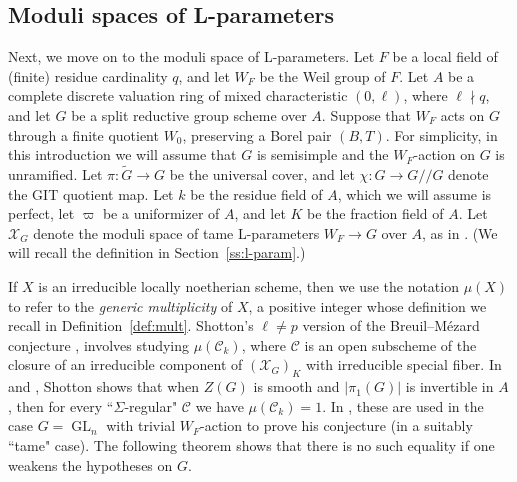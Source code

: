 \documentclass[11pt,reqno]{amsart}
\theoremstyle{definition}
\newcommand{\sC}{{\mathscr C}}
\newcommand{\sX}{{\mathscr X}}
\DeclareMathOperator{\GL}{GL}
\begin{document}
\subsection{Moduli spaces of L-parameters}

Next, we move on to the moduli space of L-parameters. Let $F$ be a local field of (finite) residue cardinality $q$, and let $W_F$ be the Weil group of $F$. Let $A$ be a complete discrete valuation ring of mixed characteristic $(0, \ell)$, where $\ell \nmid q$, and let $G$ be a split reductive group scheme over $A$. Suppose that $W_F$ acts on $G$ through a finite quotient $W_0$, preserving a Borel pair $(B, T)$. For simplicity, in this introduction we will assume that $G$ is semisimple and the $W_F$-action on $G$ is unramified. Let $\pi\colon \widetilde{G} \to G$ be the universal cover, and let $\chi\colon G \to G/\!/G$ denote the GIT quotient map. Let $k$ be the residue field of $A$, which we will assume is perfect, let $\varpi$ be a uniformizer of $A$, and let $K$ be the fraction field of $A$. Let $\sX_G$ denote the moduli space of tame L-parameters $W_F \to G$ over $A$, as in \cite{DHKM}. (We will recall the definition in Section~\ref{ss:l-param}.)

If $X$ is an irreducible locally noetherian scheme, then we use the notation $\mu(X)$ to refer to the \textit{generic multiplicity} of $X$, a positive integer whose definition we recall in Definition~\ref{def:mult}. Shotton's $\ell \neq p$ version of the Breuil--M\'ezard conjecture \cite{Shotton-Breuil-Mezard}, \cite{Shotton-local-proof} involves studying $\mu(\sC_k)$, where $\sC$ is an open subscheme of the closure of an irreducible component of $(\sX_G)_K$ with irreducible special fiber. In \cite{Shotton-local-proof} and \cite{Shotton-irreducible}, Shotton shows that when $Z(G)$ is smooth and $|\pi_1(G)|$ is invertible in $A$, then for every ``$\Sigma$-regular" $\sC$ we have $\mu(\sC_k) = 1$. In \cite{Shotton-local-proof}, these are used in the case $G = \GL_n$ with trivial $W_F$-action to prove his conjecture (in a suitably 	``tame" case). The following theorem shows that there is no such equality if one weakens the hypotheses on $G$. 
\end{document}
